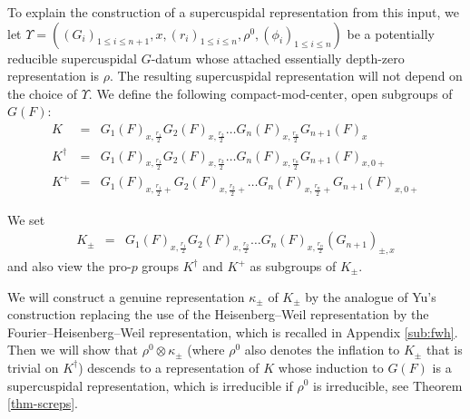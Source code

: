 \documentclass{article}
\theoremstyle{definition}
\numberwithin{equation}{subsection}
\renewcommand{\-}{\hyp{}}
\begin{document}
To explain the construction of a supercuspidal representation from this input, we let \(\Upsilon= ((G_i)_{1\leq i\leq n+1},x,(r_i)_{1\leq i\leq n},\rho^0,(\phi_i)_{1\leq i\leq n}) \) be a potentially reducible supercuspidal $G$-datum whose attached essentially depth-zero representation is $\rho$. The resulting supercuspidal representation will not depend on the choice of $\Upsilon$. We define the following compact-mod-center, open subgroups of $G(F)$: \begin{eqnarray*}
	K & =& G_1(F)_{x,\frac{r_1}{2}}G_2(F)_{x,\frac{r_2}{2}}\hdots G_n(F)_{x,\frac{r_n}{2}}G_{n+1}(F)_{x} \\
	K^\dagger & =& G_1(F)_{x,\frac{r_1}{2}}G_2(F)_{x,\frac{r_2}{2}}\hdots G_n(F)_{x,\frac{r_n}{2}}G_{n+1}(F)_{x,0+}\\
	K^+ & =& G_1(F)_{x,\frac{r_1}{2}+}G_2(F)_{x,\frac{r_2}{2}+}\hdots G_n(F)_{x,\frac{r_n}{2}+}G_{n+1}(F)_{x,0+}
\end{eqnarray*}

We set 
\begin{eqnarray*}
	K_{\pm} & =& G_1(F)_{x,\frac{r_1}{2}}G_2(F)_{x,\frac{r_2}{2}}\hdots G_n(F)_{x,\frac{r_n}{2}}(G_{n+1})_{\pm,x} 
\end{eqnarray*}
and also view the pro-$p$ groups $K^\dagger$ and $K^+$ as subgroups of $K_{\pm}$. 


We will construct a genuine representation $\kappa_{\pm}$ of $K_{\pm}$ by the analogue of Yu's construction replacing the use of the Heisenberg--Weil representation by the Fourier--Heisenberg--Weil representation, which is recalled in Appendix \ref{sub:fwh}. Then we will show that $\rho^0 \otimes \kappa_{\pm}$ (where $\rho^0$ also denotes the inflation to $K_\pm$ that is trivial on $K^\dagger$) descends to a representation of $K$ whose induction to $G(F)$ is a supercuspidal representation, which is irreducible if $\rho^0$ is irreducible, see Theorem \ref{thm-screps}.
\end{document}
